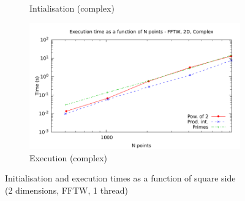 \documentclass[12pt, a4paper]{article}
\begin{document}
\begin{figure}[H]
\begin{subfigure}{.5\textwidth}
\caption{Intialisation (complex)}
\label{2DFFTWCI}
\end{subfigure}%
\begin{subfigure}{.5\textwidth}
\centering
\includegraphics[width=.9\linewidth]{graphs/2d-fftw-exec-c.pdf}
\caption{Execution (complex)}
\label{2DFFTWC}
\end{subfigure}
\caption{Initialisation and execution times as a function of square side\\(2 dimensions, FFTW, 1 thread)}
\label{2DFFTW}
\end{figure}
\end{document}

